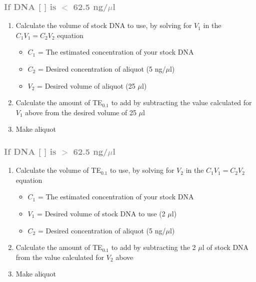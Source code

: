 \documentclass[12pt, hidelinks]{article}
\begin{document}
		\subsubsection{\textcolor{Gray}{If DNA [  ] is $<$ 62.5 ng/$\mu$l}}	
			\begin{enumerate}
				\item Calculate the volume of stock DNA to use, by solving for $V_{1}$ in the $C_{1}V_{1} = C_{2}V_{2}$ equation
					\begin{itemize}
						\item $C_{1}$ = The estimated concentration of your stock DNA
						\item $C_{2}$ = Desired concentration of aliquot (5 ng/$\mu$l)
						\item $V_{2}$ = Desired volume of aliquot (25 $\mu$l)
					\end{itemize}
				\item Calculate the amount of TE$_{0.1}$ to add by subtracting the value calculated for $V_{1}$ above from the desired volume of 25 $\mu$l
				\item Make aliquot
			\end{enumerate}	
	
		\subsubsection{\textcolor{Gray}{If DNA [  ] is $>$ 62.5 ng/$\mu$l}}	
			\begin{enumerate}
				\item Calculate the volume of TE$_{0.1}$ to use, by solving for $V_{2}$ in the $C_{1}V_{1} = C_{2}V_{2}$ equation
					\begin{itemize}
						\item $C_{1}$ = The estimated concentration of your stock DNA
						\item $V_{1}$ = Desired volume of stock DNA to use (2 $\mu$l)
						\item $C_{2}$ = Desired concentration of aliquot (5 ng/$\mu$l)
					\end{itemize}
				\item Calculate the amount of TE$_{0.1}$ to add by subtracting the 2 $\mu$l of stock DNA from the value calculated for $V_{2}$ above 			\item Make aliquot
			\end{enumerate}	
\end{document}
